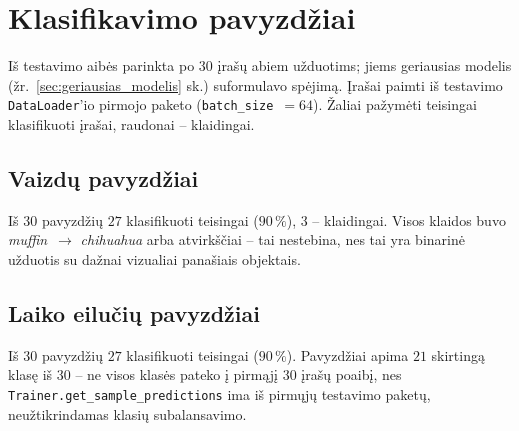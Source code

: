 \section{Klasifikavimo pavyzdžiai}
\label{sec:pavyzdziu_klasifikacija}

Iš testavimo aibės parinkta po $30$ įrašų abiem užduotims; jiems geriausias modelis (žr.~\ref{sec:geriausias_modelis} sk.) suformulavo spėjimą. Įrašai paimti iš testavimo \texttt{DataLoader}'io pirmojo paketo (\texttt{batch\_size}~$=64$). Žaliai pažymėti teisingai klasifikuoti įrašai, raudonai – klaidingai.

\subsection{Vaizdų pavyzdžiai}
\label{subsec:pavyzdziai_vaizdai}



Iš $30$ pavyzdžių $27$ klasifikuoti teisingai ($90\,\%$), $3$ – klaidingai. Visos klaidos buvo \textit{muffin}~$\rightarrow$ \textit{chihuahua} arba atvirkščiai – tai nestebina, nes tai yra binarinė užduotis su dažnai vizualiai panašiais objektais.

\subsection{Laiko eilučių pavyzdžiai}
\label{subsec:pavyzdziai_keystroke}



Iš $30$ pavyzdžių $27$ klasifikuoti teisingai ($90\,\%$). Pavyzdžiai apima $21$ skirtingą klasę iš $30$ – ne visos klasės pateko į pirmąjį $30$ įrašų poaibį, nes \texttt{Trainer.get\_sample\_predictions} ima iš pirmųjų testavimo paketų, neužtikrindamas klasių subalansavimo.
